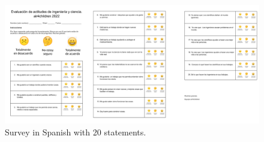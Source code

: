 \documentclass[sigconf,anonymous,review]{acmart}
\begin{document}
\begin{figure} %
  \centering
    \includegraphics[width=\linewidth]{../figures/surveys/outputs/drawing-v00.png}  %
    \caption{
    Survey in Spanish with 20 statements.
    }
    \label{fig:survey}
\end{figure}


%

%
%
\end{document}
